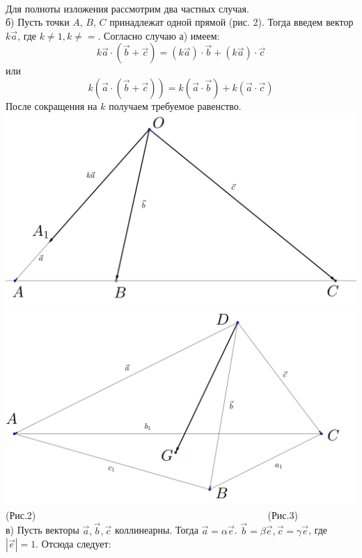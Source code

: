 \documentclass{article}
\begin{document}
\\Для полноты изложения рассмотрим два частных случая.
\\б) Пусть точки $A$, $B$, $C$ принадлежат одной прямой (рис. 2). Тогда введем вектор $k\overrightarrow{a}$, где $k\neq1,k\neq=$. Согласно случаю а) имеем:
$$k\overrightarrow{a}\cdot(\overrightarrow{b}+\overrightarrow{c})=(k\overrightarrow{a})\cdot\overrightarrow{b}+(k\overrightarrow{a})\cdot\overrightarrow{c}$$
или
$$k(\overrightarrow{a}\cdot(\overrightarrow{b}+\overrightarrow{c}))=k(\overrightarrow{a}\cdot\overrightarrow{b})+k(\overrightarrow{a}\cdot\overrightarrow{c})$$
После сокращения на $k$ получаем требуемое равенство.
\\
\includegraphics[scale=0.12]{vector2.png}
\includegraphics[scale=0.12]{vector3.png}
(Рис.2)$\hspace{10cm}$(Рис.3)
\\в) Пусть векторы $\overrightarrow{a},\overrightarrow{b},\overrightarrow{c}$ коллинеарны. Тогда $\overrightarrow{a}=\alpha\overrightarrow{e}$. $\overrightarrow{b}=\beta\overrightarrow{e},\overrightarrow{c}=\gamma\overrightarrow{e}$, где $|\overrightarrow{e}|=1$. Отсюда следует:
\end{document}
